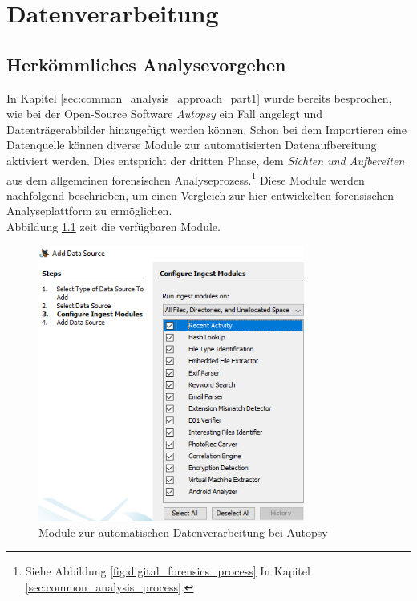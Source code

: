 \chapter{Datenverarbeitung}
\label{ch:data_processing}

\section{Herkömmliches Analysevorgehen}
\label{sec:common_analysis_approach_part2}

In Kapitel \ref{sec:common_analysis_approach_part1} wurde bereits besprochen, wie bei der Open-Source Software \textit{Autopsy} ein Fall angelegt und Datenträgerabbilder hinzugefügt werden können. Schon bei dem Importieren eine Datenquelle können diverse Module zur automatisierten Datenaufbereitung aktiviert werden. Dies entspricht der dritten Phase, dem \textit{Sichten und Aufbereiten} aus dem allgemeinen forensischen Analyseprozess.\footnote{Siehe Abbildung \ref{fig:digital_forensics_process} In Kapitel \ref{sec:common_analysis_process}.} Diese Module werden nachfolgend beschrieben, um einen Vergleich zur hier entwickelten forensischen Analyseplattform zu ermöglichen.\\
Abbildung \ref{fig:autopsy_2_ingest_modules} zeit die verfügbaren Module.

\begin{figure}[ht]
  \centering
  \includegraphics[width=0.78\textwidth]{./resource/autopsy_2_ingest_modules.png}
  \caption{Module zur automatischen Datenverarbeitung bei Autopsy}
  \label{fig:autopsy_2_ingest_modules}
\end{figure}

